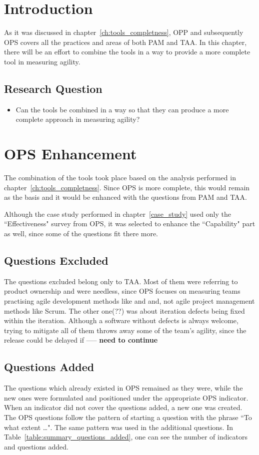 \section{Introduction}
As it was discussed in chapter~\ref{ch:tools_completness}, OPP and subsequently OPS covers all the practices and areas of both PAM and TAA. In this chapter, there will be an effort to combine the tools in a way to provide a more complete tool in measuring agility.

\subsection{Research Question}
\begin{itemize}
	\item Can the tools be combined in a way so that they can produce a more complete approach in measuring agility?
\end{itemize}

\section{OPS Enhancement}
The combination of the tools took place based on the analysis performed in chapter~\ref{ch:tools_completness}. Since OPS is more complete, this would remain as the basis and it would be enhanced with the questions from PAM and TAA.

Although the case study performed in chapter~\ref{case_study} used only the ``Effectiveness" survey from OPS, it was selected to enhance the ``Capability" part as well, since some of the questions fit there more.

\subsection{Questions Excluded}
The questions excluded belong only to TAA. Most of them were referring to product ownership and were needless, since OPS focuses on measuring teams practising agile development methods like  and and, not agile project management methods like Scrum. The other one(??) was about iteration defects being fixed within the iteration. Although a software without defects is always welcome, trying to mitigate all of them throws away some of the team's agility, since the release could be delayed if ----- \textbf{need to continue}

\subsection{Questions Added}
The questions which already existed in OPS remained as they were, while the new ones were formulated and positioned under the appropriate OPS indicator. When an indicator did not cover the questions added, a new one was created. The OPS questions follow the pattern of starting a question with the phrase ``To what extent \dots ". The same pattern was used in the additional questions. In Table~\ref{table:summary_questions_added}, one can see the number of indicators and questions added. 

